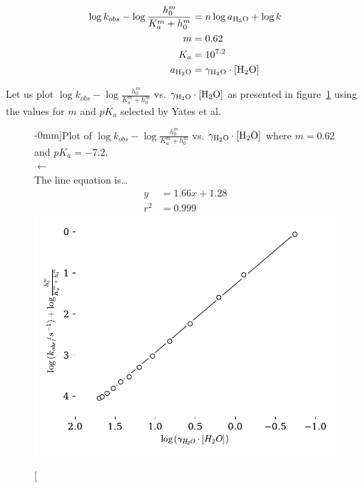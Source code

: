\documentclass[]{tufte-handout}
\begin{document}
\begin{align*}
   \log{k_{obs}}-\log{\frac{h_0^m}{K_a^m + h_0^m}} &=  n\log{a_{\ce{H2O}} + \log{k}} \\
   m &= 0.62 \\
   K_a &= 10^{7.2} \\
   a_{\ce{H2O}} &= \gamma_{\ce{H2O}} \cdot [\ce{H2O}]
  \label{eq:5X}
\end{align*}

Let us plot $\log{k_{obs}}-\log{\frac{h_0^m}{K_a^m + h_0^m}}$ vs. $\gamma_{\ce{H2O}} \cdot [\ce{H2O}]$ as presented in figure~\ref{fig:fig13} using the values for $m$ and $pK_a$ selected by Yates et al.

\begin{figure}[h!]
  \centering
  \caption[][-0mm]{Plot of $\log{k_{obs}}-\log{\frac{h_0^m}{K_a^m + h_0^m}}$ vs. $\gamma_{\ce{H2O}} \cdot [\ce{H2O}]$ where $m = 0.62$ and $pK_a = -7.2$.\\ $\longleftarrow$ \\ The line equation is\ldots \begin{align*}y &= 1.66x+1.28 \\ r^2 &= 0.999\end{align*}} 
  \includegraphics[scale=0.7]{images/fig13}
  \label{fig:fig13}
\end{figure}
\end{document}
